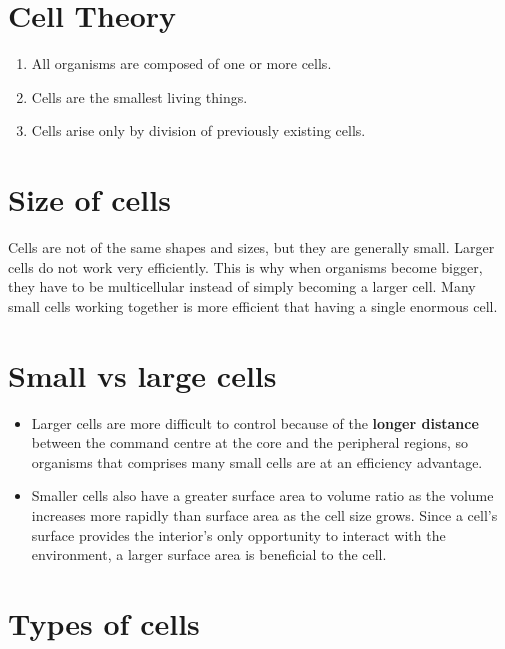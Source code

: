 \documentclass[11pt]{article}
\begin{document}
\section{Cell Theory}
\label{sec:orgf00f0ae}
\begin{enumerate}
\item All organisms are composed of one or more cells.
\item Cells are the smallest living things.
\item Cells arise only by division of previously existing cells.
\end{enumerate}

\section{Size of cells}
\label{sec:org1da4227}
Cells are not of the same shapes and sizes, but they are generally small. Larger cells do not work very efficiently. This is why when organisms become bigger, they have to be multicellular instead of simply becoming a larger cell. Many small cells working together is more efficient that having a single enormous cell.

\section{Small vs large cells}
\label{sec:org36ea311}
\begin{itemize}
\item Larger cells are more difficult to control because of the \textbf{longer distance} between the command centre at the core and the peripheral regions, so organisms that comprises many small cells are at an efficiency advantage.
\item Smaller cells also have a greater surface area to volume ratio as the volume increases more rapidly than surface area as the cell size grows. Since a cell's surface provides the interior's only opportunity to interact with the environment, a larger surface area is beneficial to the cell.
\end{itemize}

\newpage

\section{Types of cells}
\label{sec:org76b20e8}
\end{document}
